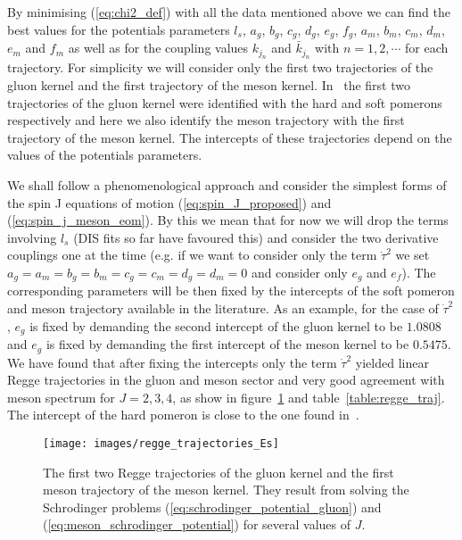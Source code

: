 \documentclass[a4paper,12pt]{article}
\begin{document}
By minimising (\ref{eq:chi2_def}) with all the data mentioned above we can find the best values for the potentials parameters $l_s$, $a_g$, $b_g$, $c_g$, $d_g$, $e_g$, $f_g$, $a_m$, $b_m$, $c_m$, $d_m$, $e_m$ and $f_m$  as well as for the coupling values $k_{j_n}$ and $\bar{k}_{j_n}$ with $ n = 1, 2, \cdots$ for each trajectory. For simplicity we will consider only the first two trajectories of the gluon kernel and the first trajectory of the meson kernel. In~\cite{ballon_bayona_unity_2017} the first two trajectories of the gluon kernel were identified with the hard and soft pomerons respectively and here we also identify the meson trajectory with the first trajectory of the meson kernel. The intercepts of these trajectories depend on the values of the potentials parameters.

 We shall follow a phenomenological approach and consider the simplest forms of the spin J equations of motion (\ref{eq:spin_J_proposed}) and (\ref{eq:spin_j_meson_eom}). By this we mean that for now we will drop the terms involving $l_s$ (DIS fits so far have favoured this) and consider the two derivative couplings one at the time (e.g. if we want to consider only the term $\dot{\tau}^2$ we set $a_g = a_m = b_g = b_m = c_g = c_m = d_g = d_m = 0$ and consider only $e_g$ and $e_f$). The corresponding parameters will be then fixed by the intercepts of the soft pomeron and meson trajectory available in the literature. As an example, for the case of $\dot{\tau}^2$, $e_g$ is fixed by demanding the second intercept of the gluon kernel to be $1.0808$ and $e_g$ is fixed by demanding the first intercept of the meson kernel to be $0.5475$. We have found that after fixing the intercepts only the term $\dot{\tau}^2$ yielded linear Regge trajectories in the gluon and meson sector and very good agreement with meson spectrum for $J = 2, 3, 4$, as show in figure~\ref{fig:regge_trajectories} and table~\ref{table:regge_traj}. The intercept of the hard pomeron is close to the one found in~\cite{ballon_bayona_unity_2017, Amorim:2018yod}.
 \begin{figure}[!t]
  \center
  \texttt{[image: images/regge\_trajectories\_Es]} 
  \caption{The first two Regge trajectories of the gluon kernel and the first meson trajectory of the meson kernel. They result from solving the Schrodinger problems (\ref{eq:schrodinger_potential_gluon}) and (\ref{eq:meson_schrodinger_potential}) for several values of $J$.}
  \label{fig:regge_trajectories}
\end{figure}
\end{document}
